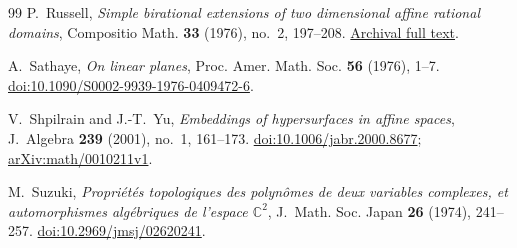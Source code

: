 \documentclass[11pt]{article}
\numberwithin{equation}{section}
\newcommand{\CC}{\mathbb C}
\begin{document}
\begin{thebibliography}{99}
P.~Russell,
\emph{Simple birational extensions of two dimensional affine rational domains},
Compositio Math. \textbf{33} (1976), no.~2, 197--208.
\href{https://www.numdam.org/item/CM_1976__33_2_197_0/}{Archival full text}.

A.~Sathaye,
\emph{On linear planes},
Proc. Amer. Math. Soc. \textbf{56} (1976), 1--7.
\href{https://doi.org/10.1090/S0002-9939-1976-0409472-6}{doi:10.1090/S0002-9939-1976-0409472-6}.

V.~Shpilrain and J.-T.~Yu,
\emph{Embeddings of hypersurfaces in affine spaces},
J.~Algebra \textbf{239} (2001), no.~1, 161--173.
\href{https://doi.org/10.1006/jabr.2000.8677}{doi:10.1006/jabr.2000.8677};
\href{https://arxiv.org/abs/math/0010211v1}{arXiv:math/0010211v1}.

M.~Suzuki,
\emph{Propri\'et\'es topologiques des polyn\^omes de deux variables complexes,
et automorphismes alg\'ebriques de l'espace $\CC^2$},
J.~Math. Soc. Japan \textbf{26} (1974), 241--257.
\href{https://doi.org/10.2969/jmsj/02620241}{doi:10.2969/jmsj/02620241}.

\end{thebibliography}
\end{document}
